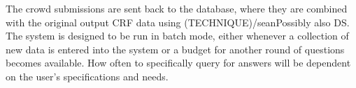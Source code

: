 The crowd submissions are sent back to the database, where they are combined with the original output CRF data using (TECHNIQUE)/sean{Possibly also DS}.  The system is designed to be run in batch mode, either whenever a collection of new data is entered into the system or a budget for another round of questions becomes available.  How often to specifically query for answers will be dependent on the user's specifications and needs. 

